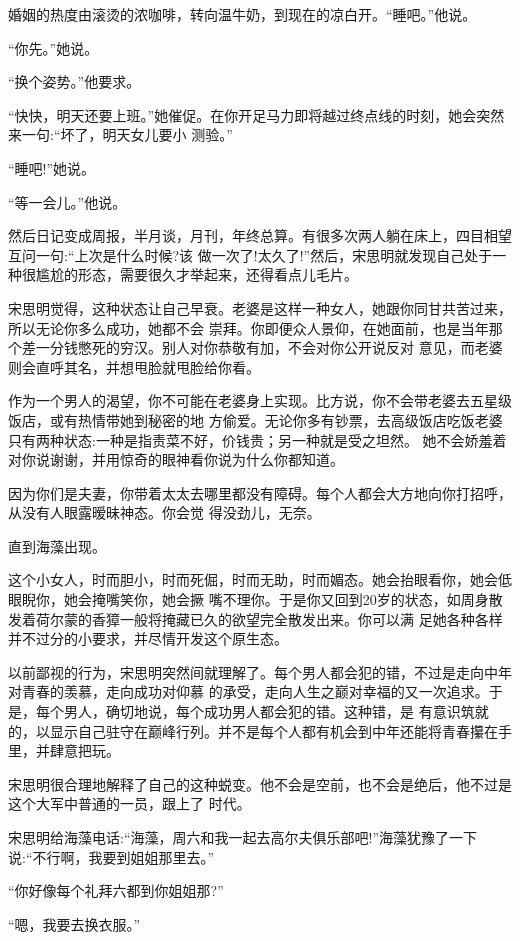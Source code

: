 \documentclass[11pt,a4paper,onecolumn]{article}
\begin{document}
婚姻的热度由滚烫的浓咖啡，转向温牛奶，到现在的凉白开。``睡吧。''他说。

``你先。''她说。

``换个姿势。''他要求。

``快快，明天还要上班。''她催促。在你开足马力即将越过终点线的时刻，她会突然来一句:``坏了，明天女儿要小
测验。''

``睡吧!''她说。

``等一会儿。''他说。

然后日记变成周报，半月谈，月刊，年终总算。有很多次两人躺在床上，四目相望互问一句:``上次是什么时候?该
做一次了!太久了!''然后，宋思明就发现自己处于一种很尴尬的形态，需要很久才举起来，还得看点儿毛片。

宋思明觉得，这种状态让自己早衰。老婆是这样一种女人，她跟你同甘共苦过来，所以无论你多么成功，她都不会
崇拜。你即便众人景仰，在她面前，也是当年那个差一分钱憋死的穷汉。别人对你恭敬有加，不会对你公开说反对
意见，而老婆则会直呼其名，并想甩脸就甩脸给你看。

作为一个男人的渴望，你不可能在老婆身上实现。比方说，你不会带老婆去五星级饭店，或有热情带她到秘密的地
方偷爱。无论你多有钞票，去高级饭店吃饭老婆只有两种状态:一种是指责菜不好，价钱贵；另一种就是受之坦然。
她不会娇羞着对你说谢谢，并用惊奇的眼神看你说为什么你都知道。

因为你们是夫妻，你带着太太去哪里都没有障碍。每个人都会大方地向你打招呼，从没有人眼露暧昧神态。你会觉
得没劲儿，无奈。

直到海藻出现。

这个小女人，时而胆小，时而死倔，时而无助，时而媚态。她会抬眼看你，她会低眼睨你，她会掩嘴笑你，她会撅
嘴不理你。于是你又回到20岁的状态，如周身散发着荷尔蒙的香獐一般将掩藏已久的欲望完全散发出来。你可以满
足她各种各样并不过分的小要求，并尽情开发这个原生态。

以前鄙视的行为，宋思明突然间就理解了。每个男人都会犯的错，不过是走向中年对青春的羡慕，走向成功对仰慕
的承受，走向人生之巅对幸福的又一次追求。于是，每个男人，确切地说，每个成功男人都会犯的错。这种错，是
有意识筑就的，以显示自己驻守在巅峰行列。并不是每个人都有机会到中年还能将青春攥在手里，并肆意把玩。

宋思明很合理地解释了自己的这种蜕变。他不会是空前，也不会是绝后，他不过是这个大军中普通的一员，跟上了
时代。

宋思明给海藻电话:``海藻，周六和我一起去高尔夫俱乐部吧!''海藻犹豫了一下说:``不行啊，我要到姐姐那里去。''

``你好像每个礼拜六都到你姐姐那?''

``嗯，我要去换衣服。''
\end{document}
